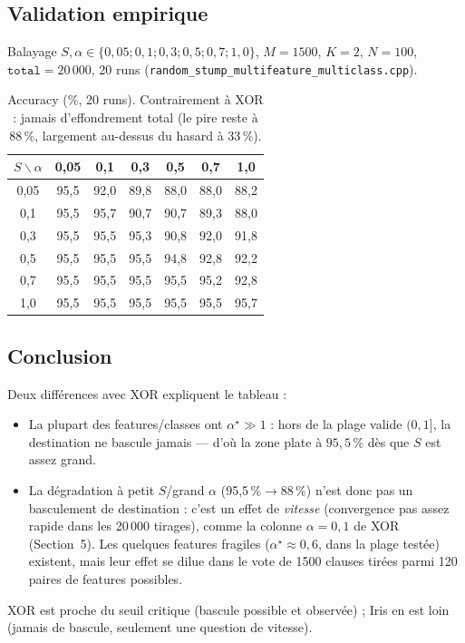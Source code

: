 \documentclass[12pt,a4paper]{article}
\theoremstyle{remark}
\begin{document}
\subsection{Validation empirique}

Balayage $S,\alpha\in\{0{,}05;0{,}1;0{,}3;0{,}5;0{,}7;1{,}0\}$, $M=1500$, $K=2$,
$N=100$, $\mathtt{total}=20\,000$, 20 runs
(\texttt{random\_stump\_multifeature\_multiclass.cpp}).

\begin{table}[h]
\centering
\renewcommand{\arraystretch}{1.2}
\begin{tabular}{ccccccc}
\toprule
$S \backslash \alpha$ & 0,05 & 0,1 & 0,3 & 0,5 & 0,7 & 1,0 \\
\midrule
0,05 & 95,5 & 92,0 & 89,8 & 88,0 & 88,0 & 88,2 \\
0,1  & 95,5 & 95,7 & 90,7 & 90,7 & 89,3 & 88,0 \\
0,3  & 95,5 & 95,5 & 95,3 & 90,8 & 92,0 & 91,8 \\
0,5  & 95,5 & 95,5 & 95,5 & 94,8 & 92,8 & 92,2 \\
0,7  & 95,5 & 95,5 & 95,5 & 95,5 & 95,2 & 92,8 \\
1,0  & 95,5 & 95,5 & 95,5 & 95,5 & 95,5 & 95,7 \\
\bottomrule
\end{tabular}
\caption{Accuracy (\%, 20 runs). Contrairement à XOR : jamais d'effondrement
total (le pire reste à 88\,\%, largement au-dessus du hasard à 33\,\%).}
\end{table}

\subsection{Conclusion}

Deux différences avec XOR expliquent le tableau :
\begin{itemize}
  \item La plupart des features/classes ont $\alpha^\star \gg 1$ : hors de la
  plage valide $(0,1]$, la destination ne bascule jamais --- d'où la zone plate
  à $95{,}5\,\%$ dès que $S$ est assez grand.
  \item La dégradation à petit $S$/grand $\alpha$ (95,5\,\%$\to$88\,\%) n'est
  donc pas un basculement de destination : c'est un effet de \emph{vitesse}
  (convergence pas assez rapide dans les 20\,000 tirages), comme la colonne
  $\alpha=0{,}1$ de XOR (Section~5). Les quelques features fragiles
  ($\alpha^\star\approx0{,}6$, dans la plage testée) existent, mais leur effet
  se dilue dans le vote de 1500 clauses tirées parmi 120 paires de features
  possibles.
\end{itemize}
XOR est proche du seuil critique (bascule possible et observée) ; Iris en est
loin (jamais de bascule, seulement une question de vitesse).
\end{document}
